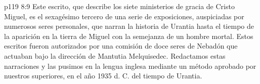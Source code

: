 \separatorline
\vsetoff
\vs p119 8:9 Este escrito, que describe los siete ministerios de gracia de Cristo Miguel, es el sexagésimo tercero de una serie de exposiciones, auspiciadas por numerosos seres personales, que narran la historia de Urantia hasta el tiempo de la aparición en la tierra de Miguel con la semejanza de un hombre mortal. Estos escritos fueron autorizados por una comisión de doce seres de Nebadón que actuaban bajo la dirección de Mantutia Melquisedec. Redactamos estas narraciones y las pusimos en la lengua inglesa mediante un método aprobado por nuestros superiores, en el año 1935 d. C. del tiempo de Urantia.
